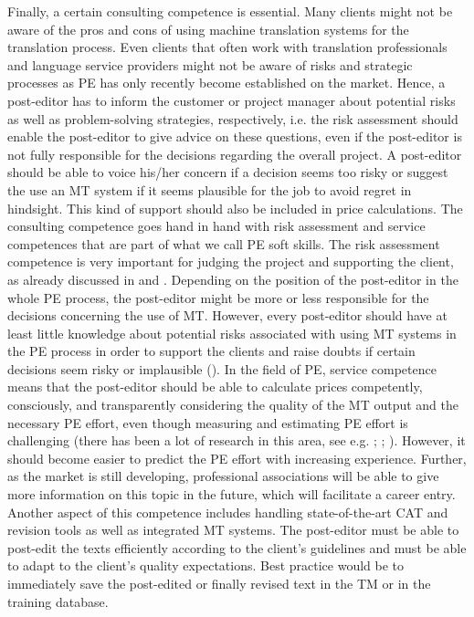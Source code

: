 Finally, a certain consulting competence is essential. Many clients might not be aware of the pros and cons of using machine translation systems for the translation process. Even clients that often work with translation professionals and language service providers might not be aware of risks and strategic processes as PE has only recently become established on the market. Hence, a post-editor has to inform the customer or project manager about potential risks as well as problem-solving strategies, respectively, i.e. the risk assessment should enable the post-editor to give advice on these questions, even if the post-editor is not fully responsible for the decisions regarding the overall project. A post-editor should be able to voice his/her concern if a decision seems too risky or suggest the use an MT system if it seems plausible for the job to avoid regret in hindsight. This kind of support should also be included in price calculations.   
The consulting competence goes hand in hand with risk assessment and service competences that are part of what we call PE soft skills. The risk assessment competence is very important for judging the project and supporting the client, as already discussed in  and . Depending on the position of the post-editor in the whole PE process, the post-editor might be more or less responsible for the decisions concerning the use of MT. However, every post-editor should have at least little knowledge about potential risks associated with using MT systems in the PE process in order to support the clients and raise doubts if certain decisions seem risky or implausible (\citealt{kenny2020fair}).
In the field of PE, service competence means that the post-editor should be able to calculate prices competently, consciously, and transparently considering the quality of the MT output and the necessary PE effort, even though measuring and estimating PE effort is challenging (there has been a lot of research in this area, see e.g. \citealt{specia2011exploiting}; \citealt{moorkens2015correlations}; \citealt{schaeffer2014measuring}). However, it should become easier to predict the PE effort with increasing experience. Further, as the market is still developing, professional associations will be able to give more information on this topic in the future, which will facilitate a career entry. Another aspect of this competence includes handling state-of-the-art CAT and revision tools as well as integrated MT systems. The post-editor must be able to post-edit the texts efficiently according to the client’s guidelines and must be able to adapt to the client's quality expectations. Best practice would be to immediately save the post-edited or finally revised text in the TM or in the training database.

